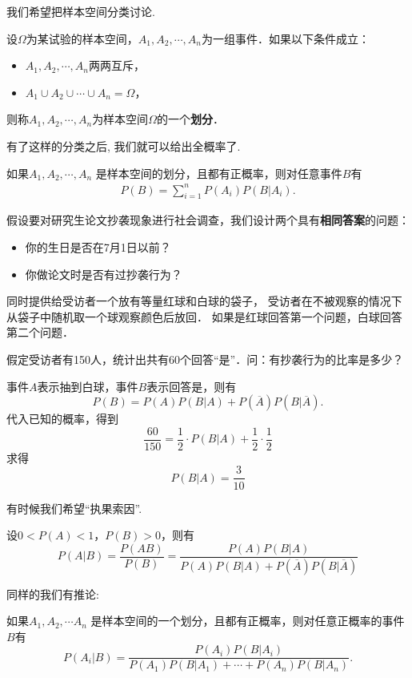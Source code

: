 我们希望把样本空间分类讨论.

\begin{definition}
    设$\Omega$为某试验的样本空间，$A_1, A_2, \cdots, A_n$为一组事件．如果以下条件成立：
    \begin{itemize}
        \item $A_1, A_2, \cdots, A_n$两两互斥，
        \item $A_1 \cup A_2 \cup \cdots \cup A_n=\Omega$，
    \end{itemize}
    则称$A_1, A_2, \cdots , A_n$为样本空间$\Omega$的一个\textbf{划分}．
\end{definition}

有了这样的分类之后, 我们就可以给出全概率了.

\begin{theorem}[全概率公式]
    如果$A_1, A_2, \cdots, A_n$ 是样本空间的划分，且都有正概率，则对任意事件$B$有
    \begin{align*}
        P(B)=\sum_{i=1}^n P(A_i) P(B|A_i).
    \end{align*}
\end{theorem}

\begin{example}
    假设要对研究生论文抄袭现象进行社会调查，我们设计两个具有\textbf{相同答案}的问题：
    \begin{itemize}
        \item 你的生日是否在7月1日以前？
        \item 你做论文时是否有过抄袭行为？
    \end{itemize}
    同时提供给受访者一个放有等量红球和白球的袋子，
    受访者在不被观察的情况下从袋子中随机取一个球观察颜色后放回．
    如果是红球回答第一个问题，白球回答第二个问题．

    假定受访者有150人，统计出共有60个回答“是”．问：有抄袭行为的比率是多少？
\end{example}

\begin{solution}
    事件$A$表示抽到白球，事件$B$表示回答是，则有
    $$P(B)=P(A)P(B|A)+P(\overline{A})P(B|\overline{A}).$$
    代入已知的概率，得到
    $$\frac{60}{150}=\frac12\cdot P(B|A)+\frac12\cdot\frac12 $$
    求得
    $$P(B|A)=\frac{3}{10}$$
\end{solution}

有时候我们希望``执果索因''.

\begin{theorem}[Bayes定理]
    设$0<P(A)<1$，$P(B)>0$，则有
    $$P(A|B)=\frac{P(AB)}{P(B)}
        =\frac{P(A)P(B|A)}{P(A)P(B|A)+P(\overline{A})P(B|\overline{A})}$$
\end{theorem}

同样的我们有推论:

\begin{corollary}
    如果$A_1, A_2, \cdots A_n$ 是样本空间的一个划分，且都有正概率，则对任意正概率的事件$B$有
    \[
        P(A_i|B)=\frac{P(A_i)P(B|A_i)}{P(A_1)P(B|A_1)+\cdots+P(A_n)P(B|A_n)}.%
    \]
\end{corollary}
